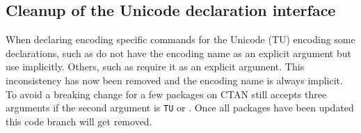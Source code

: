 \subsection{Cleanup of the Unicode declaration interface}

When declaring encoding specific commands for the Unicode (TU)
encoding some declarations, such as  do
not have the encoding name as an explicit argument but use
 implicitly. Others, such as
 require it as an explicit argument.  This
inconsistency has now been removed and the encoding name is always
implicit. To avoid a breaking change for a few packages on CTAN
 still accepts three arguments if the second
argument is \texttt{TU} or . Once all packages
have been updated this code branch will get removed.
%



